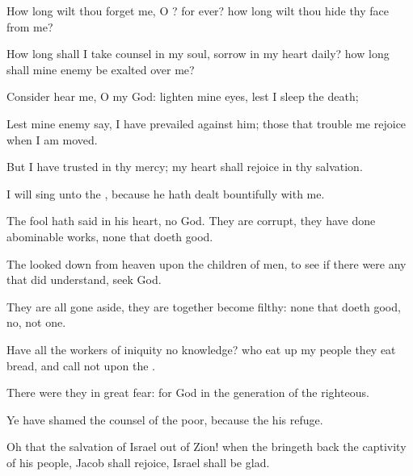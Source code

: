{\Q {}How long wilt thou
forget me, O
{}? for
ever? how long wilt thou
hide thy
face from me?


\par }{\Q {}How long shall I
take
counsel in my
soul,
{}
sorrow in my
heart
daily? how long shall mine
enemy be
exalted over me?


\par }{\Q {}Consider
{}
hear me, O
{} my
God:
lighten mine
eyes, lest I
sleep the
{}
death;


\par }{\Q {}Lest mine
enemy
say, I have
prevailed against him;
{} those that
trouble me
rejoice when I am
moved.


\par }{\Q {}But I have
trusted in thy
mercy; my
heart shall
rejoice in thy
salvation.


\par }{\Q {}I will
sing unto the
{}, because he hath dealt
bountifully with me.




\par }
{\Q {}The
fool hath
said in his
heart,
{} no
God. They are
corrupt, they have done
abominable
works,
{} none that
doeth
good.


\par }{\Q {}The
{} looked
down from
heaven upon the
children of
men, to
see if
there were any that did
understand,
{}
seek
God.


\par }{\Q {}They are all gone
aside, they are
{}
together become
filthy:
{} none that
doeth
good, no, not
one.


\par }{\BB \par }
{\Q {}Have all the
workers of
iniquity no
knowledge? who eat
up my
people
{} they
eat
bread, and
call not upon the
{}.


\par }{\Q {}There were they in
great
fear: for
God
{} in the
generation of the
righteous.


\par }{\Q {}Ye have
shamed the
counsel of the
poor, because the
{}
{} his
refuge.


\par }{\Q {}Oh
that the
salvation of
Israel
{} out of
Zion! when the
{} bringeth
back the
captivity of his
people,
Jacob shall
rejoice,
{}
Israel shall be
glad.




\par }
